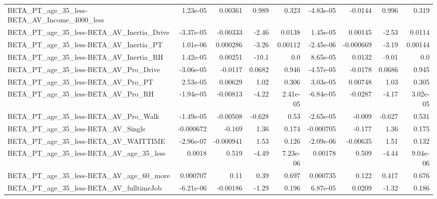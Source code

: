 \begin{tabular}{lrrrrrrrr}
BETA\_PT\_age\_35\_less-BETA\_AV\_Income\_4000\_less       &    1.23e-05 &      0.00361 &    0.989 &    0.323 &  -4.83e-05 &     -0.0144 &        0.996 &         0.319 \\
BETA\_PT\_age\_35\_less-BETA\_AV\_Inertia\_Drive          &   -3.37e-05 &     -0.00333 &    -2.46 &   0.0138 &   1.45e-05 &     0.00145 &        -2.53 &        0.0114 \\
BETA\_PT\_age\_35\_less-BETA\_AV\_Inertia\_PT             &    1.01e-06 &     0.000286 &    -3.26 &  0.00112 &  -2.45e-06 &   -0.000669 &        -3.19 &       0.00144 \\
BETA\_PT\_age\_35\_less-BETA\_AV\_Inertia\_RH             &    1.42e-05 &      0.00251 &    -10.1 &      0.0 &   8.65e-05 &      0.0132 &        -9.01 &           0.0 \\
BETA\_PT\_age\_35\_less-BETA\_AV\_Pro\_Drive              &   -3.06e-05 &      -0.0117 &   0.0682 &    0.946 &  -4.57e-05 &     -0.0178 &       0.0686 &         0.945 \\
BETA\_PT\_age\_35\_less-BETA\_AV\_Pro\_PT                 &    2.53e-05 &      0.00629 &     1.02 &    0.306 &   3.03e-05 &     0.00748 &         1.03 &         0.305 \\
BETA\_PT\_age\_35\_less-BETA\_AV\_Pro\_RH                 &   -1.94e-05 &     -0.00813 &    -4.22 & 2.41e-05 &  -6.84e-05 &     -0.0287 &        -4.17 &      3.02e-05 \\
BETA\_PT\_age\_35\_less-BETA\_AV\_Pro\_Walk               &   -1.49e-05 &     -0.00508 &   -0.628 &     0.53 &  -2.65e-05 &      -0.009 &       -0.627 &         0.531 \\
BETA\_PT\_age\_35\_less-BETA\_AV\_Single                 &   -0.000672 &       -0.169 &     1.36 &    0.174 &  -0.000705 &      -0.177 &         1.36 &         0.175 \\
BETA\_PT\_age\_35\_less-BETA\_AV\_WAITTIME               &   -2.96e-07 &    -0.000941 &     1.53 &    0.126 &  -2.09e-06 &    -0.00635 &         1.51 &         0.132 \\
BETA\_PT\_age\_35\_less-BETA\_AV\_age\_35\_less            &      0.0018 &        0.519 &    -4.49 & 7.23e-06 &    0.00178 &       0.509 &        -4.44 &      9.04e-06 \\
BETA\_PT\_age\_35\_less-BETA\_AV\_age\_60\_more            &    0.000707 &         0.11 &     0.39 &    0.697 &   0.000735 &       0.122 &        0.417 &         0.676 \\
BETA\_PT\_age\_35\_less-BETA\_AV\_fulltimeJob            &   -6.21e-06 &     -0.00186 &    -1.29 &    0.196 &   6.87e-05 &      0.0209 &        -1.32 &         0.186 \\

\end{tabular}
